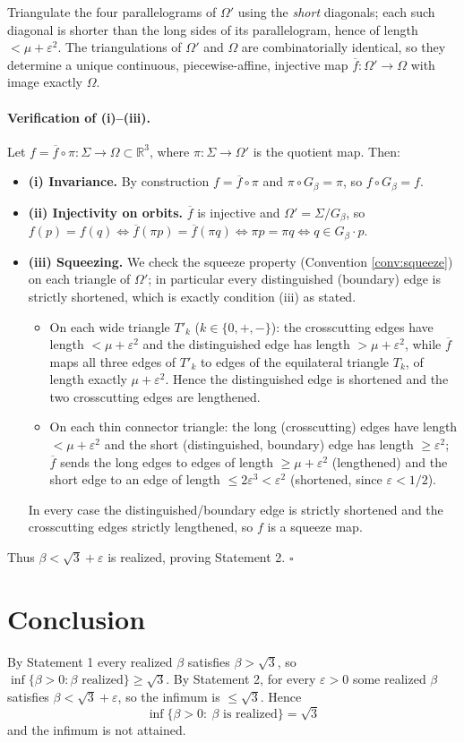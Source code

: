 \documentclass[12pt]{article}
\newcommand{\R}{\mathbb{R}}
\newcommand{\eps}{\varepsilon}
\newcommand{\Sig}{\Sigma}
\begin{document}
Triangulate the four parallelograms of $\Omega'$ using the \emph{short}
diagonals; each such diagonal is shorter than the long sides of its
parallelogram, hence of length $<\mu+\eps^2$. The triangulations of
$\Omega'$ and $\Omega$ are combinatorially identical, so they determine a
unique continuous, piecewise-affine, injective map
$\overline f:\Omega'\to\Omega$ with image exactly $\Omega$.

\paragraph{Verification of (i)--(iii).}
Let $f=\overline f\circ\pi:\Sig\to\Omega\subset\R^3$, where
$\pi:\Sig\to\Omega'$ is the quotient map. Then:
\begin{itemize}
\item \textbf{(i) Invariance.} By construction $f=\overline f\circ\pi$
and $\pi\circ G_\beta=\pi$, so $f\circ G_\beta=f$.
\item \textbf{(ii) Injectivity on orbits.} $\overline f$ is injective and
$\Omega'=\Sig/G_\beta$, so $f(p)=f(q)\iff\overline f(\pi p)=\overline
f(\pi q)\iff\pi p=\pi q\iff q\in G_\beta\cdot p$.
\item \textbf{(iii) Squeezing.} We check the squeeze property
(Convention \ref{conv:squeeze}) on each triangle of $\Omega'$; in
particular every distinguished (boundary) edge is strictly shortened,
which is exactly condition (iii) as stated.
\begin{itemize}
\item On each wide triangle $T'_k$ ($k\in\{0,+,-\}$): the crosscutting
edges have length $<\mu+\eps^2$ and the distinguished edge has length
$>\mu+\eps^2$, while $\overline f$ maps all three edges of $T'_k$ to edges
of the equilateral triangle $T_k$, of length exactly $\mu+\eps^2$. Hence
the distinguished edge is shortened and the two crosscutting edges are
lengthened.
\item On each thin connector triangle: the long (crosscutting) edges have
length $<\mu+\eps^2$ and the short (distinguished, boundary) edge has
length $\ge\eps^2$; $\overline f$ sends the long edges to edges of length
$\ge\mu+\eps^2$ (lengthened) and the short edge to an edge of length
$\le2\eps^3<\eps^2$ (shortened, since $\eps<1/2$).
\end{itemize}
In every case the distinguished/boundary edge is strictly shortened and
the crosscutting edges strictly lengthened, so $f$ is a squeeze map.
\end{itemize}
Thus $\beta<\sqrt3+\eps$ is realized, proving Statement 2. \hfill$\square$

\section{Conclusion}

By Statement 1 every realized $\beta$ satisfies $\beta>\sqrt3$, so
$\inf\{\beta>0:\beta\text{ realized}\}\ge\sqrt3$. By Statement 2, for
every $\eps>0$ some realized $\beta$ satisfies $\beta<\sqrt3+\eps$, so the
infimum is $\le\sqrt3$. Hence
\[
\boxed{\ \inf\{\beta>0:\ \beta\text{ is realized}\}=\sqrt3\ }
\]
and the infimum is not attained.
\end{document}
